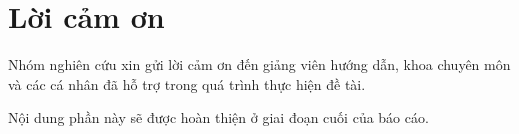 \chapter*{Lời cảm ơn}

Nhóm nghiên cứu xin gửi lời cảm ơn đến giảng viên hướng dẫn, khoa chuyên môn và các cá nhân đã hỗ trợ trong quá trình thực hiện đề tài.

Nội dung phần này sẽ được hoàn thiện ở giai đoạn cuối của báo cáo.
